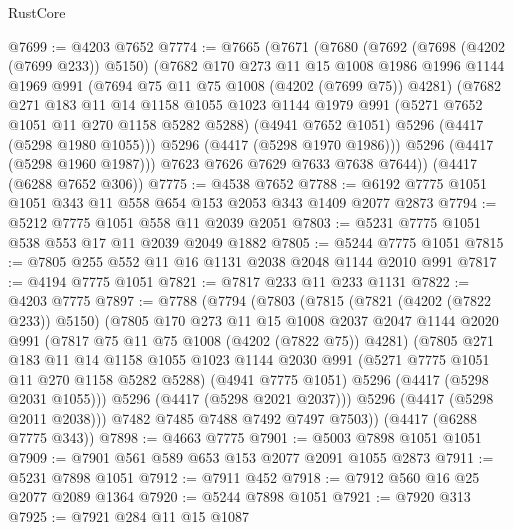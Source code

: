 \begin{lexlean}{RustCore}
\begin{coremodule}
@7699 := @4203 @7652
@7774 := @7665
    (@7671
      (@7680
        (@7692
          (@7698 (@4202 (@7699 @233)) @5150)
          (@7682
            @170
            @273
            @11
            @15
            @1008
            @1986
            @1996
            @1144
            @1969
            @991
            (@7694 @75 @11 @75 @1008 (@4202 (@7699 @75)) @4281)
            (@7682
              @271
              @183
              @11
              @14
              @1158
              @1055
              @1023
              @1144
              @1979
              @991
              (@5271 @7652 @1051 @11 @270 @1158 @5282 @5288)
              (@4941 @7652 @1051)
              @5296
              (@4417 (@5298 @1980 @1055)))
            @5296
            (@4417 (@5298 @1970 @1986)))
          @5296
          (@4417 (@5298 @1960 @1987)))
        @7623
        @7626
        @7629
        @7633
        @7638
        @7644))
    (@4417 (@6288 @7652 @306))
@7775 := @4538 @7652
@7788 := @6192 @7775 @1051 @1051 @343 @11 @558 @654 @153 @2053 @343 @1409 @2077 @2873
@7794 := @5212 @7775 @1051 @558 @11 @2039 @2051
@7803 := @5231 @7775 @1051 @538 @553 @17 @11 @2039 @2049 @1882
@7805 := @5244 @7775 @1051
@7815 := @7805 @255 @552 @11 @16 @1131 @2038 @2048 @1144 @2010 @991
@7817 := @4194 @7775 @1051
@7821 := @7817 @233 @11 @233 @1131
@7822 := @4203 @7775
@7897 := @7788
    (@7794
      (@7803
        (@7815
          (@7821 (@4202 (@7822 @233)) @5150)
          (@7805
            @170
            @273
            @11
            @15
            @1008
            @2037
            @2047
            @1144
            @2020
            @991
            (@7817 @75 @11 @75 @1008 (@4202 (@7822 @75)) @4281)
            (@7805
              @271
              @183
              @11
              @14
              @1158
              @1055
              @1023
              @1144
              @2030
              @991
              (@5271 @7775 @1051 @11 @270 @1158 @5282 @5288)
              (@4941 @7775 @1051)
              @5296
              (@4417 (@5298 @2031 @1055)))
            @5296
            (@4417 (@5298 @2021 @2037)))
          @5296
          (@4417 (@5298 @2011 @2038)))
        @7482
        @7485
        @7488
        @7492
        @7497
        @7503))
    (@4417 (@6288 @7775 @343))
@7898 := @4663 @7775
@7901 := @5003 @7898 @1051 @1051
@7909 := @7901 @561 @589 @653 @153 @2077 @2091 @1055 @2873
@7911 := @5231 @7898 @1051
@7912 := @7911 @452
@7918 := @7912 @560 @16 @25 @2077 @2089 @1364
@7920 := @5244 @7898 @1051
@7921 := @7920 @313
@7925 := @7921 @284 @11 @15 @1087

\end{coremodule}
\end{lexlean}
